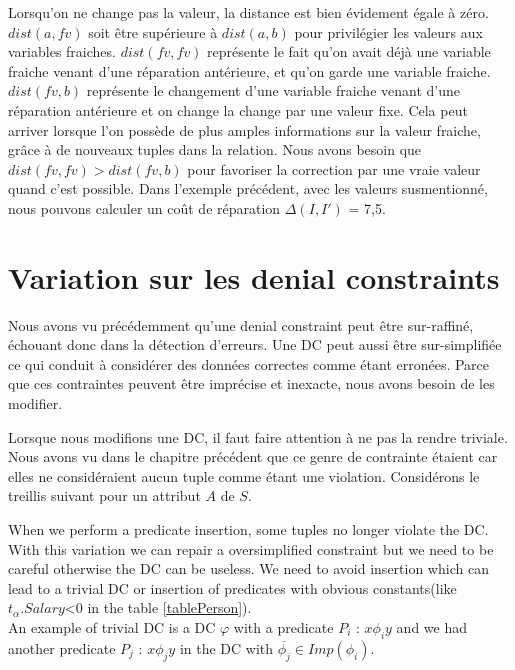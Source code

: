 \documentclass[letterpaper, 12pt]{report}
\theoremstyle{definition}
\begin{document}
Lorsqu'on ne change pas la valeur, la distance est bien évidement égale à zéro. $dist(a,fv)$ soit être supérieure à $dist(a,b)$ pour privilégier les valeurs aux variables fraiches. $dist(fv,fv)$ représente le fait qu'on avait déjà une variable fraiche venant d'une réparation antérieure, et qu'on garde une variable fraiche. $dist(fv,b)$ représente le changement d'une variable fraiche venant d'une réparation antérieure et on change la change par une valeur fixe. Cela peut arriver lorsque l'on possède de plus amples informations sur la valeur fraiche, grâce à de nouveaux tuples dans la relation. Nous avons besoin que $dist(fv,fv) > dist(fv,b)$ pour favoriser la correction par une vraie valeur quand c'est possible. Dans l'exemple précédent, avec les valeurs susmentionné, nous pouvons calculer un coût de réparation $\Delta(I,I')$ = 7,5.


\section{Variation sur les denial constraints}

Nous avons vu précédemment qu'une denial constraint peut être sur-raffiné, échouant donc dans la détection d'erreurs. Une DC peut aussi être sur-simplifiée ce qui conduit à considérer des données correctes comme étant erronées. Parce que ces contraintes peuvent être imprécise et inexacte, nous avons besoin de les modifier.

Lorsque nous modifions une DC, il faut faire attention à ne pas la rendre triviale. Nous avons vu dans le chapitre précédent que ce genre de contrainte étaient car elles ne considéraient aucun tuple comme étant une violation. Considérons le treillis suivant pour un attribut $A$ de $S$.

When we perform a predicate insertion, some tuples no longer violate the DC. With this variation we can repair a oversimplified constraint but we need to be careful otherwise the DC can be useless. We need to avoid insertion which can lead to a trivial DC or insertion of predicates with obvious constants(like $t_\alpha.Salary$<0 in the table \ref{tablePerson}). \\

An example of trivial DC is a DC $\varphi$ with a predicate $P_i$ : $x \phi_i y$ and we had another predicate $P_j$ : $x \phi_j y$ in the DC with $\overline{\phi_j} \in Imp(\phi_i)$. \\
\end{document}
